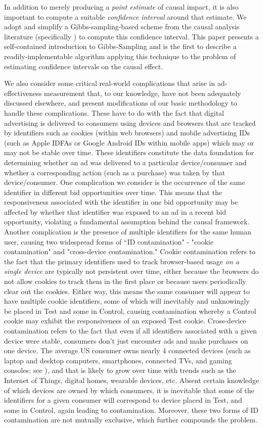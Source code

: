 \documentclass[11pt,a4paper]{article}
\theoremstyle{definition}
\theoremstyle{remark}
\theoremstyle{definition}
\theoremstyle{definition}
\theoremstyle{definition}
\theoremstyle{definition}
\theoremstyle{definition}
\theoremstyle{definition}
\begin{document}
In addition to merely producing a \textit{point estimate} of causal impact, it is also important to compute a suitable \textit{confidence interval} around that estimate. We adopt and simplify a Gibbs-sampling-based scheme from the causal analysis literature (specifically \cite{Chickering1996}) to compute this confidence interval. This paper presents a self-contained introduction to Gibbs-Sampling and is the first to describe a readily-implementable algorithm applying this technique to the problem of estimating confidence intervals on the causal effect. 

We also consider some critical real-world complications that arise in ad-effectiveness measurement that, to our knowledge, have not been adequately discussed elsewhere, and present modifications of our basic methodology to handle these complications. These have to do with the fact that digital advertising is delivered to consumers using devices and browsers that are tracked by identifiers such as cookies (within web browsers) and mobile advertising IDs (such as Apple IDFAs or Google Android IDs within mobile apps) which may or may not be stable over time. These identifiers constitute the data foundation for determining whether an ad was delivered to a particular device/consumer and whether a corresponding action (such as a purchase) was taken by that device/consumer. One complication we consider is the occurrence of the same identifier in different bid opportunities over time. This means that the responsiveness associated with the identifier in one bid opportunity may be affected by whether that identifier was exposed to an ad in a recent bid opportunity, violating a fundamental assumption behind the causal framework. Another complication is the presence of multiple identifiers for the same human user, causing two widespread forms of “ID contamination" - "cookie contamination" and "cross-device contamination." Cookie contamination refers to the fact that the primary identifiers used to track browser-based usage \textit{on a single device} are typically not persistent over time, either because the browsers do not allow cookies to track them in the first place or because users periodically clear out the cookies. Either way, this means the same consumer will appear to have multiple cookie identifiers, some of which will inevitably and unknowingly be placed in Test and some in Control, causing contamination whereby a Control cookie may exhibit the responsiveness of an exposed Test cookie. Cross-device contamination refers to the fact that even if all identifiers associated with a given device were stable, consumers don’t just encounter ads and make purchases on one device. The average US consumer owns nearly 4 connected devices (such as laptop and desktop computers, smartphones, connected TVs, and gaming consoles; see   \cite{buckle-2016}),
and that is likely to grow over time with trends such as the Internet of Things, digital homes, wearable devices, etc. Absent certain knowledge of which devices are owned by which consumers, it is inevitable that some of the identifiers for a given consumer will correspond to device placed in Test, and some in Control, again leading to contamination. Moreover, these two forms of ID contamination are not mutually exclusive, which further compounds the problem.
\end{document}
